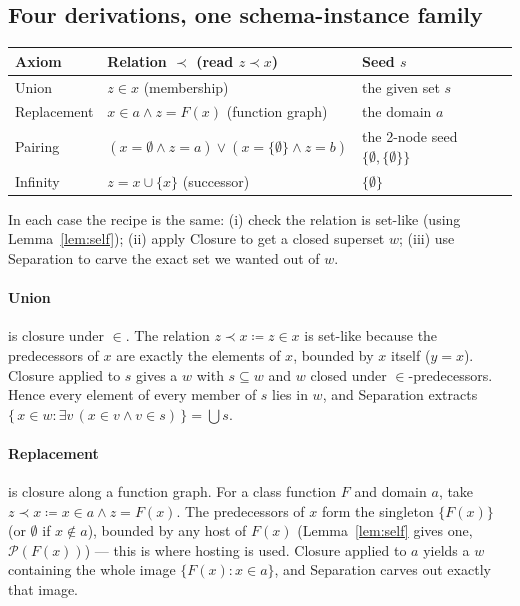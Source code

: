 \documentclass[11pt]{article}
\theoremstyle{plain}
\theoremstyle{definition}
\newcommand{\Pow}{\mathcal{P}}
\begin{document}
\subsection{Four derivations, one schema-instance family}

\begin{center}
\renewcommand{\arraystretch}{1.35}
\begin{tabular}{@{}lll@{}}
\toprule
Axiom & Relation $\prec$ (read $z \prec x$) & Seed $s$ \\
\midrule
Union       & $z \in x$ \hfill (membership) & the given set $s$ \\
Replacement & $x \in a \wedge z = F(x)$ \hfill (function graph) & the domain $a$ \\
Pairing     & $(x{=}\emptyset \wedge z{=}a)\vee(x{=}\{\emptyset\}\wedge z{=}b)$ & the 2-node seed $\{\emptyset,\{\emptyset\}\}$ \\
Infinity    & $z = x \cup \{x\}$ \hfill (successor) & $\{\emptyset\}$ \\
\bottomrule
\end{tabular}
\end{center}

In each case the recipe is the same: (i) check the relation is set-like (using
Lemma~\ref{lem:self}); (ii) apply Closure to get a closed superset $w$; (iii) use
Separation to carve the exact set we wanted out of $w$.

\paragraph{Union} is closure under $\in$. The relation $z \prec x \coloneqq z \in x$
is set-like because the predecessors of $x$ are exactly the elements of $x$,
bounded by $x$ itself ($y = x$). Closure applied to $s$ gives a $w$ with
$s \subseteq w$ and $w$ closed under $\in$-predecessors. Hence every element of
every member of $s$ lies in $w$, and Separation extracts
$\{\,x \in w : \exists v\,(x \in v \wedge v \in s)\,\} = \bigcup s$.

\paragraph{Replacement} is closure along a function graph. For a class function
$F$ and domain $a$, take $z \prec x \coloneqq x \in a \wedge z = F(x)$. The
predecessors of $x$ form the singleton $\{F(x)\}$ (or $\emptyset$ if
$x \notin a$), bounded by any host of $F(x)$ (Lemma~\ref{lem:self} gives one,
$\Pow(F(x))$) --- this is where hosting is used. Closure applied to $a$ yields a $w$
containing the whole image
$\{F(x) : x \in a\}$, and Separation carves out exactly that image.
\end{document}
